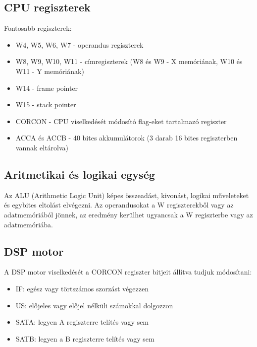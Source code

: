 \subsection{CPU regiszterek}

Fontosabb regiszterek:

\begin{itemize}
    \item W4, W5, W6, W7 - operandus regiszterek
    \item W8, W9, W10, W11 - címregiszterek (W8 és W9 - X memóriának, W10 és W11 - Y memóriának)
    \item W14 - frame pointer
    \item W15 - stack pointer
    \item CORCON - CPU viselkedését módosító flag-eket tartalmazó regiszter
    \item ACCA és ACCB - 40 bites akkumulátorok (3 darab 16 bites regiszterben vannak eltárolva)
\end{itemize}

\subsection{Aritmetikai és logikai egység}

Az ALU (Arithmetic Logic Unit) képes összeadást, kivonást, logikai műveleteket és egybites eltolást elvégezni. Az operandusokat a W regiszterekből vagy az adatmemóriából jönnek, az eredmény kerülhet ugyancsak a W regiszterbe vagy az adatmemóriába. 

\subsection{DSP motor}

A DSP motor viselkedését a CORCON regiszter bitjeit állítva tudjuk módosítani:

\begin{itemize}
    \item IF: egész vagy törtszámos szorzást végezzen
    \item US: előjeles vagy előjel nélküli számokkal dolgozzon
    \item SATA: legyen A regiszterre telítés vagy sem
    \item SATB: legyen a B regiszterre telítés vagy sem
\end{itemize}

